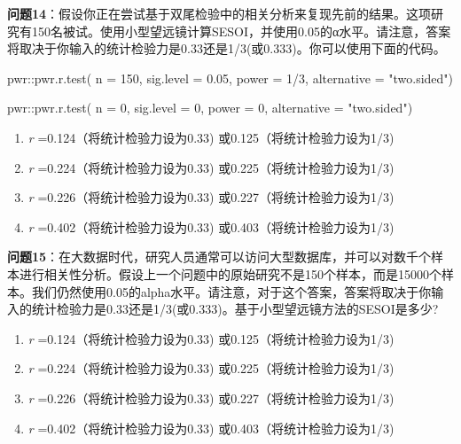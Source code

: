\documentclass[
  letterpaper,
  DIV=11,
  numbers=noendperiod]{scrreprt}
\newenvironment{Shaded}{\begin{snugshade}}{\end{snugshade}}
\newcommand{\AttributeTok}[1]{\textcolor[rgb]{0.40,0.45,0.13}{#1}}
\newcommand{\DecValTok}[1]{\textcolor[rgb]{0.68,0.00,0.00}{#1}}
\newcommand{\FloatTok}[1]{\textcolor[rgb]{0.68,0.00,0.00}{#1}}
\newcommand{\FunctionTok}[1]{\textcolor[rgb]{0.28,0.35,0.67}{#1}}
\newcommand{\NormalTok}[1]{\textcolor[rgb]{0.00,0.23,0.31}{#1}}
\newcommand{\SpecialCharTok}[1]{\textcolor[rgb]{0.37,0.37,0.37}{#1}}
\newcommand{\StringTok}[1]{\textcolor[rgb]{0.13,0.47,0.30}{#1}}
\providecommand{\tightlist}{%
  \setlength{\itemsep}{0pt}\setlength{\parskip}{0pt}}\usepackage{longtable,booktabs,array}
\begin{document}
\textbf{问题14}：假设你正在尝试基于双尾检验中的相关分析来复现先前的结果。这项研究有150名被试。使用小型望远镜计算SESOI，并使用0.05的α水平。请注意，答案将取决于你输入的统计检验力是0.33还是1/3(或0.333)。你可以使用下面的代码。

\begin{Shaded}
\begin{Highlighting}[]
\NormalTok{pwr}\SpecialCharTok{::}\FunctionTok{pwr.r.test}\NormalTok{(}
  \AttributeTok{n =} \DecValTok{150}\NormalTok{,}
  \AttributeTok{sig.level =} \FloatTok{0.05}\NormalTok{,}
  \AttributeTok{power =} \DecValTok{1}\SpecialCharTok{/}\DecValTok{3}\NormalTok{,}
  \AttributeTok{alternative =} \StringTok{"two.sided"}\NormalTok{)}
\end{Highlighting}
\end{Shaded}

\begin{Shaded}
\begin{Highlighting}[]
\NormalTok{pwr}\SpecialCharTok{::}\FunctionTok{pwr.r.test}\NormalTok{(}
  \AttributeTok{n =} \DecValTok{0}\NormalTok{, }
  \AttributeTok{sig.level =} \DecValTok{0}\NormalTok{, }
  \AttributeTok{power =} \DecValTok{0}\NormalTok{, }
  \AttributeTok{alternative =} \StringTok{"two.sided"}\NormalTok{)}
\end{Highlighting}
\end{Shaded}

\begin{enumerate}
\def\labelenumi{\Alph{enumi})}
\tightlist
\item
  \emph{r} =0.124（将统计检验力设为0.33) 或0.125（将统计检验力设为1/3)
\item
  \emph{r} =0.224（将统计检验力设为0.33) 或0.225（将统计检验力设为1/3)
\item
  \emph{r} =0.226（将统计检验力设为0.33) 或0.227（将统计检验力设为1/3)
\item
  \emph{r} =0.402（将统计检验力设为0.33) 或0.403（将统计检验力设为1/3)
\end{enumerate}

\textbf{问题15}：在大数据时代，研究人员通常可以访问大型数据库，并可以对数千个样本进行相关性分析。假设上一个问题中的原始研究不是150个样本，而是15000个样本。我们仍然使用0.05的alpha水平。请注意，对于这个答案，答案将取决于你输入的统计检验力是0.33还是1/3(或0.333)。基于小型望远镜方法的SESOI是多少?

\begin{enumerate}
\def\labelenumi{\Alph{enumi})}
\tightlist
\item
  \emph{r} =0.124（将统计检验力设为0.33) 或0.125（将统计检验力设为1/3)
\item
  \emph{r} =0.224（将统计检验力设为0.33) 或0.225（将统计检验力设为1/3)
\item
  \emph{r} =0.226（将统计检验力设为0.33) 或0.227（将统计检验力设为1/3)
\item
  \emph{r} =0.402（将统计检验力设为0.33) 或0.403（将统计检验力设为1/3)
\end{enumerate}
\end{document}
